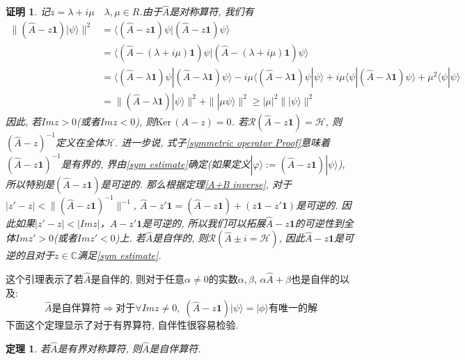 \documentclass[a4paper,11pt]{article}
\theoremstyle{mystyle}
\newtheorem{theorem}{\hspace{2em}定理}[section]
\newtheorem{Proof}{\hspace{2em}证明}[section]
\begin{document}
\begin{Proof}
  记$z=\lambda+i\mu\quad\lambda,\mu\in R$.由于$\hat{A}$是对称算符, 我们有
\begin{equation}\label{symmetric operator Proof}
  \begin{split}
     \|(\hat{A}-z\mathbf{1})|\psi\rangle\|^2 & =\langle(\hat{A}-z\mathbf{1})\psi|(\hat{A}-z\mathbf{1})\psi\rangle \\
       & =\langle(\hat{A}-(\lambda+i\mu)\mathbf{1})\psi|(\hat{A}-(\lambda+i\mu)\mathbf{1})\psi\rangle \\
       & =\langle(\hat{A}-\lambda\mathbf{1})\psi|(\hat{A}-\lambda\mathbf{1})\psi\rangle-i\mu\langle(\hat{A}-\lambda\mathbf{1})\psi|\psi\rangle+i\mu\langle\psi|(\hat{A}-\lambda\mathbf{1})\psi\rangle+\mu^2\langle\psi|\psi\rangle\\
       & =\|(\hat{A}-\lambda\mathbf{1})|\psi\rangle\|^2+\||\mu\psi\rangle\|^2\geq|\mu|^2\||\psi\rangle\|^2
  \end{split}
\end{equation}
因此, 若$Im z>0$(或者$Imz<0$), 则$\mathrm{Ker}\,(A-z)={0}$. 若$\mathcal{R}(\hat{A}-z\mathbf{1})=\mathcal{H}$, 则$(\hat{A}-z)^{-1}$定义在全体$\mathcal{H}$. 进一步说, 式子\eqref{symmetric operator Proof}意味着$(\hat{A}-z\mathbf{1})^{-1}$是有界的, 界由\eqref{sym estimate}确定(如果定义$|\varphi\rangle:=(\hat{A}-z\mathbf{1})|\psi\rangle$), 所以特别是$(\hat{A}-z\mathbf{1})$是可逆的. 那么根据定理\ref{A+B inverse}, 对于$|z'-z|<\|(\hat{A}-z\mathbf{1})^{-1}\|^{-1}$, $\hat{A}-z'\mathbf{1}=(\hat{A}-z\mathbf{1})+(z\mathbf{1}-z'\mathbf{1})$是可逆的. 因此如果$|z'-z|<|Im z|$，$A-z'\mathbf{1}$是可逆的, 所以我们可以拓展$\hat{A}-z\mathbf{1}$的可逆性到全体$Im z'>0$(或者$Imz'<0$)上. 若$\hat{A}$是自伴的, 则$\mathcal{R}(\hat{A}\pm i=\mathcal{H})$, 因此$\hat{A}-z\mathbf{1}$是可逆的且对于$z\in\mathbb{C}$满足\ref{sym estimate}.
\end{Proof}
这个引理表示了若$\hat{A}$是自伴的, 则对于任意$\alpha\neq0$的实数$\alpha,\beta$, $\alpha\hat{A}+\beta$也是自伴的以及:
\begin{equation*}
  \text{$\hat{A}$是自伴算符}\Rightarrow\text{对于$\forall Im z\neq0$},\; (\hat{A}-z\mathbf{1})|\psi\rangle=|\phi\rangle\text{有唯一的解}
\end{equation*}
下面这个定理显示了对于有界算符, 自伴性很容易检验.
\begin{theorem}
  若$\hat{A}$是有界对称算符, 则$\hat{A}$是自伴算符.
\end{theorem}
\end{document}
